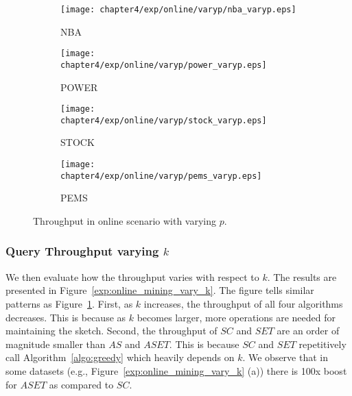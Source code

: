 \begin{figure}[t]
\centering
    \begin{subfigure}[b]{0.45\textwidth}
        \texttt{[image: chapter4/exp/online/varyp/nba\_varyp.eps]}
        \caption{NBA}
    \end{subfigure}
    \begin{subfigure}[b]{0.45\textwidth}
        \texttt{[image: chapter4/exp/online/varyp/power\_varyp.eps]}
        \caption{POWER}
    \end{subfigure}
    \begin{subfigure}[b]{0.45\textwidth}
        \texttt{[image: chapter4/exp/online/varyp/stock\_varyp.eps]}
        \caption{STOCK}
    \end{subfigure}
    \begin{subfigure}[b]{0.45\textwidth}
        \texttt{[image: chapter4/exp/online/varyp/pems\_varyp.eps]}
        \caption{PEMS}
    \end{subfigure}
\caption{Throughput in online scenario with varying $p$.}
\label{exp:online_mining_vary_P}
\end{figure}

\subsubsection{Query Throughput varying $k$} 
We then evaluate how the throughput varies with respect to $k$. 
The results are presented in Figure~\ref{exp:online_mining_vary_k}.
The figure tells similar patterns as
Figure~\ref{exp:online_mining_vary_P}.
First, as $k$ increases, the throughput of all four algorithms decreases.
This is because as $k$ becomes larger, more operations are needed for maintaining the sketch.
Second, the throughput of $SC$ and $SET$ are an order of magnitude smaller than $AS$ and $ASET$.
This is because $SC$ and $SET$ repetitively call Algorithm~\ref{algo:greedy} which heavily depends 
on $k$.
We observe that in some datasets (e.g., Figure~\ref{exp:online_mining_vary_k} (a)) there is 100x boost for $ASET$ as compared to $SC$.

